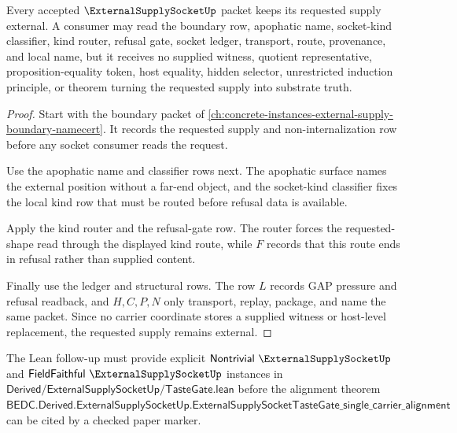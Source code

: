 \begin{theorem}
\label{thm:external-supply-socket-noninternalization}
Every accepted $\ExternalSupplySocketUp$ packet keeps its requested supply external. A consumer may read the boundary row, apophatic name, socket-kind classifier, kind router, refusal gate, socket ledger, transport, route, provenance, and local name, but it receives no supplied witness, quotient representative, proposition-equality token, host equality, hidden selector, unrestricted induction principle, or theorem turning the requested supply into substrate truth.
\end{theorem}
\begin{proof}
Start with the boundary packet of \autoref{ch:concrete-instances-external-supply-boundary-namecert}. It records the requested supply and non-internalization row before any socket consumer reads the request.

Use the apophatic name and classifier rows next. The apophatic surface names the external position without a far-end object, and the socket-kind classifier fixes the local kind row that must be routed before refusal data is available.

Apply the kind router and the refusal-gate row. The router forces the requested-shape read through the displayed kind route, while $F$ records that this route ends in refusal rather than supplied content.

Finally use the ledger and structural rows. The row $L$ records GAP pressure and refusal readback, and $H,C,P,N$ only transport, replay, package, and name the same packet. Since no carrier coordinate stores a supplied witness or host-level replacement, the requested supply remains external.
\end{proof}



The Lean follow-up must provide explicit $\mathsf{Nontrivial}\ \ExternalSupplySocketUp$ and $\mathsf{FieldFaithful}\ \ExternalSupplySocketUp$ instances in $\mathsf{Derived/ExternalSupplySocketUp/TasteGate.lean}$ before the alignment theorem $\mathsf{BEDC.Derived.ExternalSupplySocketUp.ExternalSupplySocketTasteGate\_single\_carrier\_alignment}$ can be cited by a checked paper marker.

